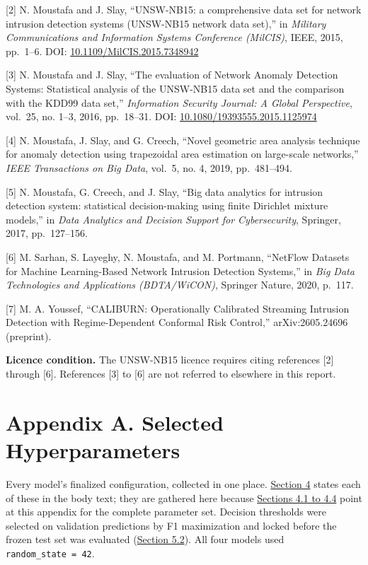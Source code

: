 \documentclass[
  canadian,
  12pt,
]{article}
\let\reportOrigSection\section
\renewcommand{\section}{\par\Needspace*{10\baselineskip}\reportOrigSection}%
\begin{document}
{[}2{]} N. Moustafa and J. Slay, ``UNSW-NB15: a comprehensive data set
for network intrusion detection systems (UNSW-NB15 network data set),''
in \emph{Military Communications and Information Systems Conference
(MilCIS)}, IEEE, 2015, pp.~1--6. DOI:
\href{https://doi.org/10.1109/MilCIS.2015.7348942}{10.1109/MilCIS.2015.7348942}

{[}3{]} N. Moustafa and J. Slay, ``The evaluation of Network Anomaly
Detection Systems: Statistical analysis of the UNSW-NB15 data set and
the comparison with the KDD99 data set,'' \emph{Information Security
Journal: A Global Perspective}, vol.~25, no. 1--3, 2016, pp.~18--31.
DOI:
\href{https://doi.org/10.1080/19393555.2015.1125974}{10.1080/19393555.2015.1125974}

{[}4{]} N. Moustafa, J. Slay, and G. Creech, ``Novel geometric area
analysis technique for anomaly detection using trapezoidal area
estimation on large-scale networks,'' \emph{IEEE Transactions on Big
Data}, vol.~5, no. 4, 2019, pp.~481--494.

{[}5{]} N. Moustafa, G. Creech, and J. Slay, ``Big data analytics for
intrusion detection system: statistical decision-making using finite
Dirichlet mixture models,'' in \emph{Data Analytics and Decision Support
for Cybersecurity}, Springer, 2017, pp.~127--156.

{[}6{]} M. Sarhan, S. Layeghy, N. Moustafa, and M. Portmann, ``NetFlow
Datasets for Machine Learning-Based Network Intrusion Detection
Systems,'' in \emph{Big Data Technologies and Applications
(BDTA/WiCON)}, Springer Nature, 2020, p.~117.

{[}7{]} M. A. Youssef, ``CALIBURN: Operationally Calibrated Streaming
Intrusion Detection with Regime-Dependent Conformal Risk Control,''
arXiv:2605.24696 (preprint).

\textbf{Licence condition.} The UNSW-NB15 licence requires citing
references {[}2{]} through {[}6{]}. References {[}3{]} to {[}6{]} are
not referred to elsewhere in this report.

\clearpage

\section{Appendix A. Selected Hyperparameters}\label{sec-app-a}

Every model's finalized configuration, collected in one place.
\hyperref[sec-4]{Section 4} states each of these in the body text; they
are gathered here because \hyperref[sec-4]{Sections 4.1 to 4.4} point at
this appendix for the complete parameter set. Decision thresholds were
selected on validation predictions by F1 maximization and locked before
the frozen test set was evaluated (\hyperref[sec-5-2]{Section 5.2}). All
four models used \texttt{random\_state\ =\ 42}.
\end{document}
